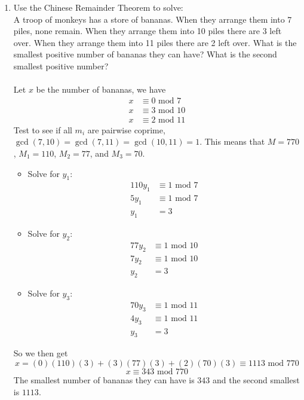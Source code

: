 \documentclass[class=article, crop=false]{standalone}
\begin{document}
\begin{enumerate}
\item
  Use the Chinese Remainder Theorem to solve:
  \\A troop of monkeys has a store of bananas.
  When they arrange them into 7 piles, none remain.
  When they arrange them into 10 piles there are 3 left over.
  When they arrange them into 11 piles there are 2 left over.
  What is the smallest positive number of bananas they can have?
  What is the second smallest positive number?\\\\
  Let $x$ be the number of bananas, we have
  \begin{align*}
	x &\equiv 0\mbox{ mod } 7 \\
	x &\equiv 3\mbox{ mod } 10 \\
	x &\equiv 2\mbox{ mod } 11
  \end{align*}
  Test to see if all $m_i$ are pairwise coprime, $\gcd(7,10)=\gcd(7,11)=\gcd(10,11)=1$.
  This means that $M=770$, $M_1=110$, $M_2=77$, and $M_3=70$.
  \begin{itemize}
	\item[] Solve for $y_1$:
	  \begin{align*}
		110y_1 &\equiv 1\mbox{ mod } 7 \\
		5y_1 &\equiv 1\mbox{ mod } 7 \\
		y_1 &= 3
	  \end{align*}

	\item[] Solve for $y_2$:
	  \begin{align*}
		77y_2 &\equiv 1\mbox{ mod } 10 \\
		7y_2 &\equiv 1\mbox{ mod } 10 \\
		y_2 &= 3
	  \end{align*}
	
	\item[] Solve for $y_3$:
	  \begin{align*}
		70y_3 &\equiv 1\mbox{ mod } 11 \\
		4y_3 &\equiv 1\mbox{ mod } 11 \\
		y_3 &= 3
	  \end{align*}
  \end{itemize}
  So we then get 
  $$x = (0)(110)(3) + (3)(77)(3) + (2)(70)(3) \equiv 1113 \mbox{ mod } 770$$
  $$x \equiv 343 \mbox{ mod } 770$$
  The smallest number of bananas they can have is $343$ and the second smallest is $1113$.


\end{enumerate}
\end{document}
